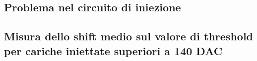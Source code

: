 \documentclass[10pt,a4paper,twoside]{report}
\begin{document}
\subsection{Problema nel circuito di iniezione}

\begin{comment}
Nel portare avanti le misure suddette, ci si è accorti di un problema nel circuito di iniezione che ne limita il range di funzionamento: l'altezza dell'impulso di iniezione infatti, cresce linearmente come aspettato fino ad un valore di $\approx$ 140 DAC, ma al al di sopra di questo valore, il circuito non solo aumenta di poco l'altezza del segnale, ma aumenta artificialmente anche il valore della threshold di un certo $\Delta V$ (o equivalentemente $\Delta Q$, collegati dal fattore di conversione in....).
Inoltre, per altezze dell'impulso di iniezione superiori a 200 DAC, solo il valore della threshold viene aumentato, senza però incrementare in alcun modo l'effettiva carica iniettata.

Per questa problematica, la caratterizzazione della threshold e della sua dispersione su tutti i flavor della matrice, ha richiesto una serie di misure ulteriori.
\end{comment}

\subsection{Misura dello shift medio sul valore di threshold per cariche iniettate superiori a 140 DAC}
\end{document}
